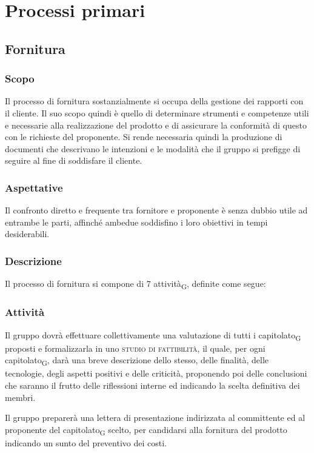 \section{Processi primari}
\subsection{Fornitura}
    \subsubsection{Scopo}
        Il processo di fornitura sostanzialmente si occupa della gestione dei rapporti con il cliente.
        Il suo scopo quindi è quello di determinare strumenti e competenze utili e necessarie alla realizzazione del prodotto e di assicurare la conformità di questo con le richieste del proponente. Si rende necessaria quindi la produzione di documenti che descrivano le intenzioni e le modalità che il gruppo si prefigge di seguire al fine di soddisfare il cliente.
    \subsubsection{Aspettative}
        Il confronto diretto e frequente tra fornitore e proponente è senza dubbio utile ad entrambe le parti, affinché ambedue soddisfino i loro obiettivi in tempi desiderabili.
    \subsubsection{Descrizione}
        Il processo di fornitura si compone  di 7 attività\textsubscript{G}, definite come segue:
    \subsubsection{Attività}
            Il gruppo dovrà effettuare collettivamente una valutazione di tutti i capitolato\textsubscript{G} proposti e formalizzarla in uno \textsc{studio di fattibilità}, il quale, per ogni capitolato\textsubscript{G}, darà una breve descrizione dello stesso, delle finalità, delle tecnologie, degli aspetti positivi e delle criticità, proponendo poi delle conclusioni che saranno il frutto delle riflessioni interne ed indicando la scelta definitiva dei membri.

            Il gruppo preparerà una lettera di presentazione indirizzata al committente ed al proponente del capitolato\textsubscript{G} scelto, per candidarsi alla fornitura del prodotto indicando un sunto del preventivo dei costi.

